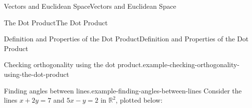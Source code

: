 \documentclass[10pt,]{book}
\numberwithin{equation}{section}
\newcommand{\RR}{\mathbb{R}}
\begin{document}
\begin{chapterptx}{Vectors and Euclidean Space}{}{Vectors and Euclidean Space}{}{}
\begin{sectionptx}{The Dot Product}{}{The Dot Product}{}{}
\begin{subsectionptx}{Definition and Properties of the Dot Product}{}{Definition and Properties of the Dot Product}{}{}
\begin{example}{Checking orthogonality using the dot product.}{example-checking-orthogonality-using-the-dot-product}
\end{example}
\begin{example}{Finding angles between lines.}{example-finding-angles-between-lines}%
\hypertarget{p-931}{}%
Consider the lines \(x+2y = 7\) and \(5x-y = 2\) in \(\RR^{2}\), plotted below:%
\begin{figure}
\centering
{
}
\end{figure}
\end{example}
\end{subsectionptx}
\end{sectionptx}
\end{chapterptx}
\end{document}
